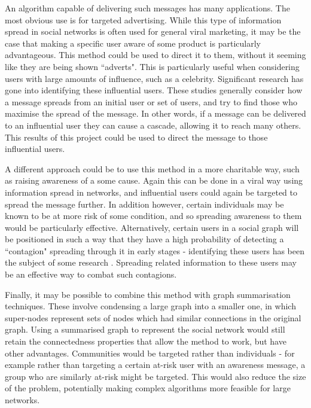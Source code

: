 \documentclass[bsc,frontabs,twoside,singlespacing,parskip,deptreport]{infthesis}     %
\begin{document}
An algorithm capable of delivering such messages has many applications. The most obvious use is for targeted advertising. While this type of information spread in social networks is often used for general viral marketing, it may be the case that making a specific user aware of some product is particularly advantageous. This method could be used to direct it to them, without it seeming like they are being shown ``adverts". This is particularly useful when considering users with large amounts of influence, such as a celebrity. Significant research has gone into identifying these influential users\cite{InfluenceMaximisation1, InfluenceMaximisation2, LabelledInfluenceMaximisation}. These studies generally consider how a message spreads from an initial user or set of users, and try to find those who maximise the spread of the message. In other words, if a message can be delivered to an influential user they can cause a cascade, allowing it to reach many others. This results of this project could be used to direct the message to those influential users.

A different approach could be to use this method in a more charitable way, such as raising awareness of a some cause. Again this can be done in a viral way using information spread in networks, and influential users could again be targeted to spread the message further. In addition however, certain individuals may be known to be at more risk of some condition, and so spreading awareness to them would be particularly effective. Alternatively, certain users in a social graph will be positioned in such a way that they have a high probability of detecting a ``contagion" spreading through it in early stages - identifying these users has been the subject of some research \cite{OutbreakDetection}. Spreading related information to these users may be an effective way to combat such contagions.

Finally, it may be possible to combine this method with graph summarisation techniques\cite{GraphSummary}. These involve condensing a large graph into a smaller one, in which super-nodes represent sets of nodes which had similar connections in the original graph. Using a summarised graph to represent the social network would still retain the connectedness properties that allow the method to work, but have other advantages. Communities would be targeted rather than individuals - for example rather than targeting a certain at-risk user with an awareness message, a group who are similarly at-risk might be targeted. This would also reduce the size of the problem, potentially making complex algorithms more feasible for large networks.
\end{document}
